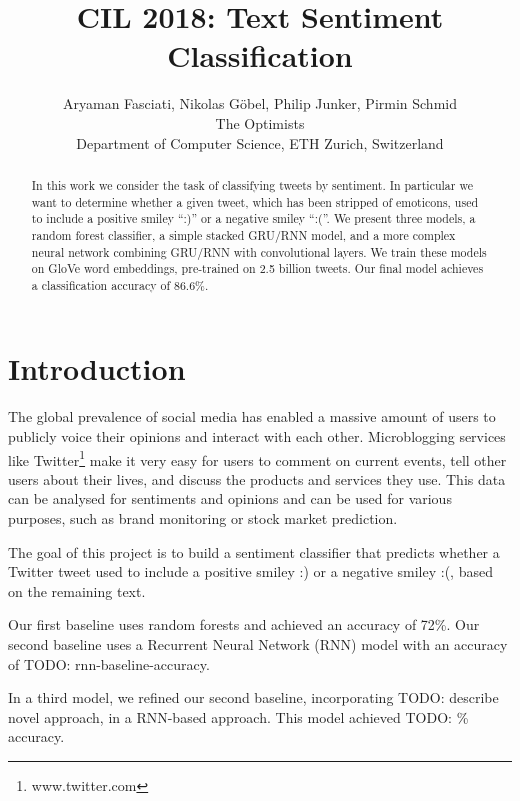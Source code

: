\documentclass[10pt,conference,compsocconf]{IEEEtran}
\newcommand{\todo}[1]{}
\renewcommand{\todo}[1]{{\color{red} TODO: {#1}}}
\begin{document}
\title{CIL 2018: Text Sentiment Classification}

\author{
  Aryaman Fasciati, Nikolas G\"obel, Philip Junker, Pirmin Schmid\\
  The Optimists\\
  Department of Computer Science, ETH Zurich, Switzerland
}

\maketitle

\begin{abstract}
  In this work we consider the task of classifying tweets by
  sentiment. In particular we want to determine whether a given tweet,
  which has been stripped of emoticons, used to include a positive
  smiley ``:)'' or a negative smiley ``:(''. We present three models,
  a random forest classifier, a simple stacked GRU/RNN model, and a
  more complex neural network combining GRU/RNN with convolutional
  layers. We train these models on GloVe word embeddings, pre-trained
  on 2.5 billion tweets. Our final model achieves a classification accuracy
  of 86.6\%.
\end{abstract}

\section{Introduction}

The global prevalence of social media has enabled a massive amount of users
to publicly voice their opinions and interact with each other.
Microblogging services like Twitter\footnote{www.twitter.com} make it
very easy for users to comment on current events, tell other users about their
lives, and discuss the products and services they use.
This data can be analysed for sentiments and opinions and can be used for
various purposes, such as brand monitoring or stock market prediction.

The goal of this project is to build a sentiment classifier that
predicts whether a Twitter tweet used to include a positive smiley :) or
a negative smiley :(, based on the remaining text.

Our first baseline uses random forests and achieved an accuracy of
72\%. Our second baseline uses a Recurrent Neural Network (RNN) model
with an accuracy of \todo{rnn-baseline-accuracy}.

In a third model, we refined our second baseline, incorporating
\todo{describe novel approach}, in a RNN-based approach. This model
achieved \todo{\%} accuracy.
\end{document}
